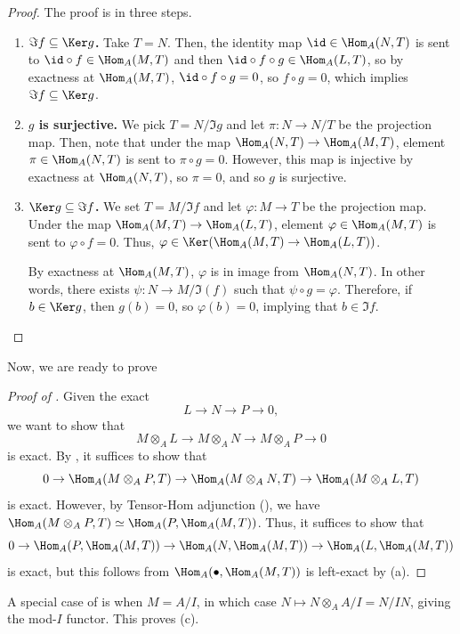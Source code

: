 \begin{proof}
    The proof is in three steps.
    \begin{enumerate}
    \item \textbf{$\Im f\subseteq \Ker g$.}
    Take $T=N$. Then, the identity map $\id\in\Hom_A(N,T)$
    is sent to $\id\circ f\in \Hom_A(M,T)$ 
    and then $\id\circ f\circ g \in\Hom_A(L,T)$,
    so by exactness at $\Hom_A(M,T)$, $\id\circ f\circ g = 0$,
    so $f\circ g = 0$, which implies 
    $\Im f\subseteq \Ker g$.
    \item \textbf{$g$ is surjective.}
    We pick $T=N/\Im g$ and let 
    $\pi : N\to N/T$ be the projection map.
    Then, note that under the map $\Hom_A(N,T) \to \Hom_A(M,T)$, element $\pi\in\Hom_A(N,T)$
    is sent to $\pi\circ g=0$.
    However, this map is injective by exactness at $\Hom_A(N,T)$, 
    so $\pi=0$, and so $g$ is surjective.
    \item \textbf{$\Ker g\subseteq\Im f$.}
    We set $T=M/\Im f$ and let $\varphi : M\to T$ be 
    the projection map.
    Under the map $\Hom_A(M,T)\to \Hom_A(L,T)$,
    element $\varphi\in\Hom_A(M,T)$ is sent to
    $\varphi\circ f = 0$.
    Thus, $\varphi\in \Ker(\Hom_A(M,T)\to\Hom_A(L,T))$.
    
    By exactness at $\Hom_A(M,T)$, $\varphi$ is in image from $\Hom_A(N,T)$.
    In other words, there exists $\psi : N\to M/\Im(f)$
    such that $\psi\circ g = \varphi$.
    Therefore, if $b\in \Ker g$, then 
    $g(b)=0$, so $\varphi(b)=0$, implying that $b\in\Im f$.
    \qedhere
    \end{enumerate}
\end{proof}
Now, we are ready to prove 
\begin{proof}[Proof of ]
    Given the exact
    $$L\to N\to P \to 0,$$
    we want to show that
    $$M\otimes_A L\to M\otimes_A N\to M\otimes_A P\to 0$$
    is exact. By , it suffices to show that
    $$0\to \Hom_A(M\otimes_A P, T)
    \to \Hom_A(M\otimes_A N, T)
    \to \Hom_A(M\otimes_A L, T)$$
    is exact. However, by Tensor-Hom adjunction
    (),
    we have $\Hom_A(M\otimes_A P, T)\simeq \Hom_A(P,\Hom_A(M,T))$.
    Thus, it suffices to show that
    $$0\to \Hom_A(P,\Hom_A(M,T))
    \to \Hom_A(N,\Hom_A(M,T))
    \to \Hom_A(L, \Hom_A(M,T))$$
    is exact, but this follows from $\Hom_A(\bullet,
    \Hom_A(M,T))$ is left-exact by  (a).
\end{proof}
\begin{remark}
    A special case of  
    is when $M=A/I$, in which case
    $N\mapsto N\otimes_A A/I = N/IN$,
    giving the mod-$I$ functor.
    This proves  (c).
\end{remark}

